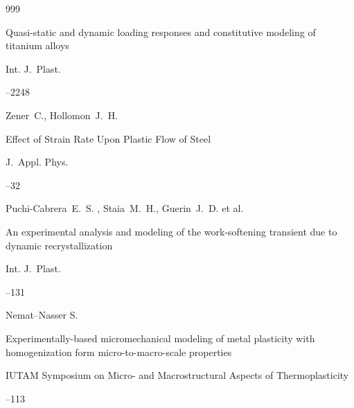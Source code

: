 \begin{thebibliography}{999}

\paper Quasi-static and dynamic loading responses and constitutive modeling of titanium alloys

\jour Int. J.~Plast. 



–2248








\by Zener~C., Hollomon~J.~H.


\paper Effect of Strain Rate Upon Plastic Flow of Steel

\jour J.~Appl. Phys.



–32





\by Puchi-Cabrera~E.~S. , Staia~M.~H.,  Guerin~J.~D. et al.

\paper An experimental analysis and modeling of the work-softening transient due to dynamic recrystallization

\jour Int. J.~Plast.



–131












\by Nemat--Nasser S.


\paper Experimentally-based micromechanical modeling of metal plasticity with homogenization form micro-to-macro-scale properties

\inbook IUTAM Symposium on Micro- and Macrostructural Aspects of Thermoplasticity

–113








\end{thebibliography}
